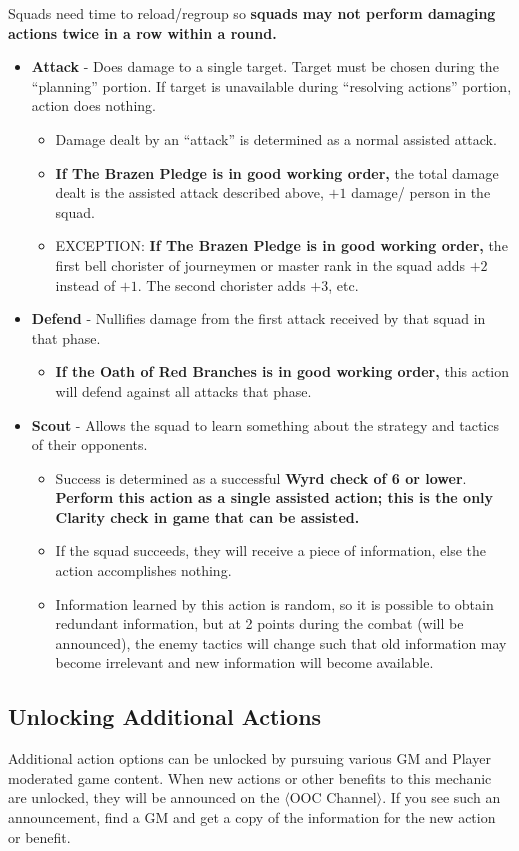 \documentclass[green]{gl2018}
\begin{document}
Squads need time to reload/regroup so {\bf squads may not perform damaging actions twice in a row within a round.}
\begin{itemize}
	\item {\bf Attack} - Does damage to a single target. Target must be chosen during the ``planning'' portion. If target is unavailable during ``resolving actions'' portion, action does nothing. 
	\begin{itemize}
		\item Damage dealt by an ``attack'' is determined as a normal assisted attack.
		\item {\bf If The Brazen Pledge is in good working order,} the total damage dealt is the assisted attack described above, $+1$ damage/ person in the squad.
		\item EXCEPTION: {\bf If The Brazen Pledge is in good working order,} the first bell chorister of journeymen or master rank in the squad adds $+2$ instead of $+1$. The second chorister adds $+3$, etc.
	\end{itemize}
	\item {\bf Defend} - Nullifies damage from the first attack received by that squad in that phase.
	\begin{itemize}
		\item {\bf If the Oath of Red Branches is in good working order,} this action will defend against all attacks that phase.
	\end{itemize}
	\item {\bf Scout} - Allows the squad to learn something about the strategy and tactics of their opponents.
	\begin{itemize}
		\item Success is determined as a successful {\bf Wyrd check of 6 or lower}. {\bf Perform this action as a single assisted action; this is the only Clarity check in game that can be assisted.} 
		\item If the squad succeeds, they will receive a piece of information, else the action accomplishes nothing.
		\item Information learned by this action is random, so it is possible to obtain redundant information, but at 2 points during the combat (will be announced), the enemy tactics will change such that old information may become irrelevant and new information will become available.
	\end{itemize}
\end{itemize}

\subsection*{Unlocking Additional Actions}
Additional action options can be unlocked by pursuing various GM and Player moderated game content. When new actions or other benefits to this mechanic are unlocked, they will be announced on the $\langle$OOC Channel$\rangle$. If you see such an announcement, find a GM and get a copy of the information for the new action or benefit.
\end{document}
